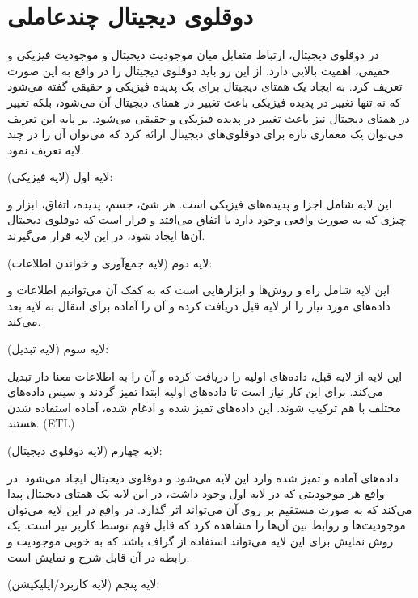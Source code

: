 \section{دوقلوی دیجیتال چندعاملی}

در دوقلوی دیجیتال، ارتباط متقابل میان موجودیت دیجیتال و موجودیت فیزیکی و حقیقی، اهمیت بالایی دارد. از این رو باید دوقلوی دیجیتال را در واقع به این صورت تعریف کرد. به ایجاد یک همتای دیجیتال برای یک پدیده فیزیکی و حقیقی گفته می‌شود که نه‌ تنها تغییر در پدیده فیزیکی باعث تغییر در همتای دیجیتال آن می‌شود، بلکه تغییر در همتای دیجیتال نیز باعث تغییر در پدیده فیزیکی و حقیقی می‌شود. بر پایه این تعریف می‌توان یک معماری تازه برای دوقلوی‌های دیجیتال ارائه کرد که می‌توان آن را در چند لایه تعریف نمود.


لایه اول (لایه فیزیکی):

این لایه شامل اجزا و پدیده‌های فیزیکی است. هر شئ، جسم، پدیده، اتفاق، ابزار و چیزی که به صورت واقعی وجود دارد یا اتفاق می‌افتد و قرار است که دوقلوی دیجیتال آن‌ها ایجاد شود، در این لایه قرار می‌گیرند.


لایه دوم (لایه جمع‌آوری و خواندن اطلاعات):

این لایه شامل راه‌‌ و روش‌ها و ابزار‌هایی است که به کمک آن می‌توانیم اطلاعات و داده‌های مورد نیاز را از لایه قبل دریافت کرده و آن را آماده برای انتقال به لایه بعد می‌کند.

لایه سوم (لایه تبدیل):

این لایه از لایه قبل، داده‌های اولیه را دریافت کرده و آن را به اطلاعات معنا دار تبدیل می‌کند. برای این کار نیاز است تا داده‌های اولیه ابتدا تمیز گردند و سپس داده‌های مختلف با هم ترکیب شوند. این داده‌های تمیز شده و ادغام شده، آماده استفاده شدن هستند. (ETL)


لایه چهارم (لایه دوقلوی دیجیتال):

داده‌های آماده و تمیز شده وارد این لایه می‌شود و دوقلوی دیجیتال ایجاد می‌شود. در واقع هر موجودیتی که در لایه اول وجود داشت، در این لایه یک همتای دیجیتال پیدا می‌کند که به صورت مستقیم بر روی آن می‌تواند اثر گذارد. در واقع در این لایه می‌توان موجودیت‌ها و روابط بین آن‌ها را مشاهده کرد که قابل فهم توسط کاربر نیز است. یک روش نمایش برای این لایه می‌تواند استفاده از گراف باشد که به خوبی موجودیت و رابطه در آن قابل شرح و نمایش است.

لایه پنجم (لایه کاربرد/اپلیکیشن):

